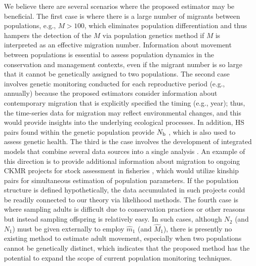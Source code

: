 \documentclass[12pt, English]{article}
\begin{document}
\begin{spacing}{1.9}
We believe there are several scenarios where the proposed estimator may be beneficial. The first case is where there is a large number of migrants between populations, e.g., $M>100$, which eliminates population differentiation and thus hampers the detection of the $M$ via population genetics method if $M$ is interpreted as an effective migration number. Information about movement between populations is essential to assess population dynamics in the conservation and management contexts, even if the migrant number is so large that it cannot be genetically assigned to two populations. The second case involves genetic monitoring conducted for each reproductive period (e.g., annually) because the proposed estimators consider information about contemporary migration that is explicitly specified the timing (e.g., year); thus, the time-series data for migration may reflect environmental changes, and this would provide insights into the underlying ecological processes. In addition, HS pairs found within the genetic population provide $N_{\rm b}$ \cite[]{wang2009new,WAPLES_2011}, which is also used to assess genetic health. The third is the case involves the development of integrated models that combine several data sources into a single analysis \cite[]{MAUNDER201361}. An example of this direction is to provide additional information about migration to ongoing CKMR projects for stock assessment in fisheries \cite[e.g.,][]{Bravington_2016,Hillary_2018,https://doi.org/10.1002/ece3.6296,ecolevol2021p,10.1093/icesjms/fsac002}, which would utilize kinship pairs for simultaneous estimation of population parameters. If the population structure is defined hypothetically, the data accumulated in such projects could be readily connected to our theory via likelihood methods. The fourth case is where sampling adults is difficult due to conservation practices or other reasons but instead sampling offspring is relatively easy. In such cases, although $N_2$ (and $N_1$) must be given externally to employ $\hat m_1$ (and $\hat M_1$), there is presently no existing method to estimate adult movement, especially when two populations cannot be genetically distinct, which indicates that the proposed method has the potential to expand the scope of current population monitoring techniques. 


\end{spacing}
\end{document}
